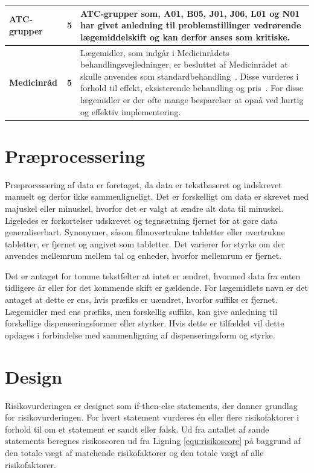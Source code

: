 \begin{longtable}{|l|c|p{9.2cm}|}
\textbf{ATC-grupper} & \textbf{5} & ATC-grupper som, A01, B05, J01, J06, L01 og N01 har givet anledning til problemstillinger vedrørende lægemiddelskift og kan derfor anses som kritiske\citep{SRN}. \\ \hline 
\textbf{Medicinråd} & \textbf{5} & Lægemidler, som indgår i Medicinrådets behandlingsvejledninger, er besluttet af Medicinrådet at skulle anvendes som standardbehandling~\citep{Medicinradet2018}. Disse vurderes i forhold til effekt, eksisterende behandling og pris~\citep{Medicinradet2018}. For disse lægemidler er der ofte mange besparelser at opnå ved hurtig og effektiv implementering.\\ \hline 
    \end{longtable}

\section{Præprocessering}
Præprocessering af data er foretaget, da data er tekstbaseret og indskrevet manuelt og derfor ikke sammenligneligt. Det er forskelligt om data er skrevet med majuskel eller minuskel, hvorfor det er valgt at ændre alt data til minuskel. Ligeledes er forkortelser udskrevet og tegnsætning fjernet for at gøre data generaliserbart. 
Synonymer, såsom filmovertrukne tabletter eller overtrukne tabletter, er fjernet og angivet som tabletter. 
Det varierer for styrke om der anvendes mellemrum mellem tal og enheder, hvorfor mellemrum er fjernet. 

Det er antaget for tomme tekstfelter at intet er ændret, hvormed data fra enten tidligere år eller for det kommende skift er gældende. For lægemidlets navn er det antaget at dette er ens, hvis præfiks er uændret, hvorfor suffiks er fjernet. Lægemidler med ens præfiks, men forskellig suffiks, kan give anledning til forskellige dispenseringsformer eller styrker. Hvis dette er tilfældet vil dette opdages i forbindelse med sammenligning af dispenseringsform og styrke. 

\section{Design}
Risikovurderingen er designet som if-then-else statements, der danner grundlag for risikovurderingen. For hvert statement vurderes én eller flere risikofaktorer i forhold til om et statement er sandt eller falsk. Ud fra antallet af sande statements beregnes risikoscoren ud fra Ligning \ref{equ:risikoscore} på baggrund af den totale vægt af matchende risikofaktorer og den totale vægt af alle risikofaktorer.

